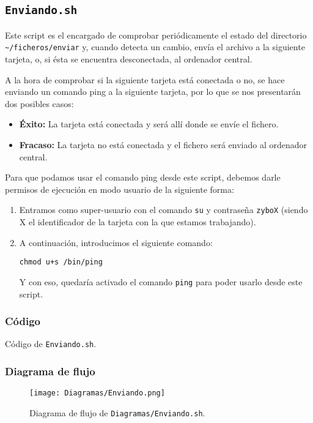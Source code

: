 \documentclass[12pt,letterpaper]{article}
\begin{document}
\newpage
\subsection{\texttt{Enviando.sh}}
Este script es el encargado de comprobar periódicamente el estado del directorio\\ \texttt{\textasciitilde/ficheros/enviar} y, cuando detecta un cambio, envía el archivo a la siguiente tarjeta, o, si ésta se encuentra desconectada, al ordenador central.

A la hora de comprobar si la siguiente tarjeta está conectada o no, se hace enviando un comando ping a la siguiente tarjeta, por lo que se nos presentarán dos posibles casos:
\begin{itemize}
	\item \textbf{Éxito:} La tarjeta está conectada y será allí donde se envíe el fichero.
	\item \textbf{Fracaso:} La tarjeta no está conectada y el fichero será enviado al ordenador central.
\end{itemize}

Para que podamos usar el comando ping desde este script, debemos darle permisos de ejecución en modo usuario de la siguiente forma:
\begin{enumerate}
	\item Entramos como super-usuario con el comando \texttt{su} y contraseña \texttt{zyboX} (siendo X el identificador de la tarjeta con la que estamos trabajando).
	\item A continuación, introducimos el siguiente comando:
	\begin{center}
		\texttt{chmod u+s /bin/ping}
	\end{center}
	Y con eso, quedaría activado el comando \texttt{ping} para poder usarlo desde este script.
\end{enumerate}

\subsubsection{Código}

\begin{center}
	Código de \texttt{Enviando.sh}.
\end{center}

\newpage
\subsubsection{Diagrama de flujo}
\begin{figure}[h]
	\centering
	\texttt{[image: Diagramas/Enviando.png]}
	\caption{Diagrama de flujo de \texttt{Diagramas/Enviando.sh}.}
	\label{Diagrama de flujo de Enviando.sh}
\end{figure}
\end{document}
